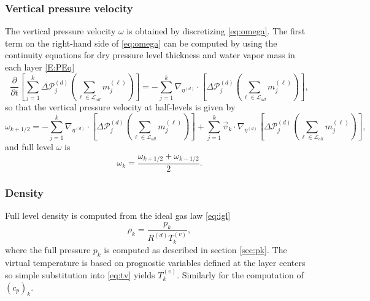 \documentclass{agujournal}
\begin{document}
{\subsubsection{Vertical pressure velocity}
The vertical pressure velocity $\omega$ is obtained by discretizing \eqref{eq:omega}. The first term on the right-hand side of \eqref{eq:omega} can be computed by using the continuity equations for dry pressure level thickness and water vapor mass in each layer \eqref{E:PEq}
\begin{equation}
\frac{\partial }{\partial t}\left[\sum_{j=1}^k \Delta \mathcal{P}^{(d)}_j \left( \sum_{\ell \in \mathcal{L}_{all}} m_j^{(\ell)}\right)\right] = -\sum_{j=1}^k \nabla_{\eta^{(d)}}\cdot \left[ \Delta \mathcal{P}^{(d)}_j\left(\sum_{\ell \in \mathcal{L}_{all}} m_j^{(\ell)} \right)\right],
\end{equation}
so that the vertical pressure velocity at half-levels is given by
\begin{equation}
\omega_{k+1/2}=-\sum_{j=1}^k \nabla_{\eta^{(d)}}\cdot \left[ \Delta \mathcal{P}^{(d)}_j\left(\sum_{\ell \in \mathcal{L}_{all}} m_j^{(\ell)} \right)\right]+\sum_{j=1}^k \vec{v}_k \cdot \nabla_{\eta^{(d)}}\left[ \Delta \mathcal{P}^{(d)}_j\left( \sum_{\ell \in \mathcal{L}_{all}} m_j^{(\ell)}\right)\right],
\end{equation}
and full level $\omega$ is
\begin{equation}
\omega_k=\frac{\omega_{k+1/2}+\omega_{k-1/2}}{2}.
\end{equation}
\subsubsection{Density}
Full level density is computed from the ideal gas law \eqref{eq:igl}
\begin{equation}
\rho_k=\frac{p_k}{R^{(d)} T_k^{(v)}},
\end{equation}
where the full pressure $p_k$ is computed as described in section \ref{sec:pk}. The virtual temperature is based on prognostic variables defined at the layer centers so simple substitution into \eqref{eq:tv} yields $T_k^{(v)}$. Similarly for the computation of $\left( c_p\right)_k$.
}
\end{document}

